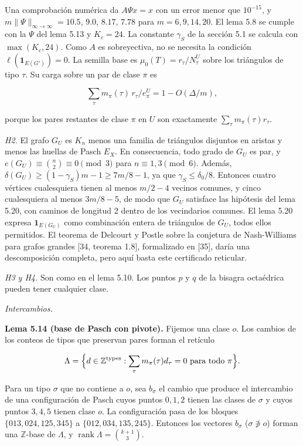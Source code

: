 \documentclass[spanish,11pt,a4paper]{article}
\begin{document}
Una comprobación numérica da \(A\Psi x=x\) con un error menor que \(10^{-15}\), y \(m\|\Psi\|_{\infty\to\infty}=10.5\), \(9.0\), \(8.17\), \(7.78\) para \(m=6,9,14,20\). El lema 5.8 se cumple con la \(\Psi\) del lema 5.13 y \(K_c=24\). La constante \(\gamma_S\) de la sección 5.1 se calcula con \(\max(K_c,24)\). Como \(A\) es sobreyectiva, no se necesita la condición \(\ell(\mathbf 1_{E(G')})=0\). La semilla base es \(\mu_0(T)=r_\tau/N^U_\tau\) sobre los triángulos de tipo \(\tau\). Su carga sobre un par de clase \(\pi\) es

\nopagebreak[4]
\[\sum_\tau m_\pi(\tau)\,r_\tau/e^U_\pi=1-O(\Delta/m),\]

porque los pares restantes de clase \(\pi\) en \(U\) son exactamente \(\sum_\tau m_\pi(\tau)r_\tau\).

\emph{H2.} El grafo \(G_U\) es \(K_n\) menos una familia de triángulos disjuntos en aristas y menos las huellas de Pasch \(E_X\). En consecuencia, todo grado de \(G_U\) es par, y \(e(G_U)\equiv\binom{n}{2}\equiv0\pmod 3\) para \(n\equiv1,3\pmod 6\). Además, \(\delta(G_U)\ge(1-\gamma_S)m-1\ge7m/8-1\), ya que \(\gamma_S\le\delta_0/8\). Entonces cuatro vértices cualesquiera tienen al menos \(m/2-4\) vecinos comunes, y cinco cualesquiera al menos \(3m/8-5\), de modo que \(G_U\) satisface las hipótesis del lema 5.20, con caminos de longitud 2 dentro de los vecindarios comunes. El lema 5.20 expresa \(\mathbf 1_{E(G_U)}\) como combinación entera de triángulos de \(G_U\), todos ellos permitidos. El teorema de Delcourt y Postle sobre la conjetura de Nash-Williams para grafos grandes {[}34, teorema 1.8{]}, formalizado en {[}35{]}, daría una descomposición completa, pero aquí basta este certificado reticular.

\emph{H3 y H4.} Son como en el lema 5.10. Los puntos \(p\) y \(q\) de la bisagra octaédrica pueden tener cualquier clase.

\emph{Intercambios.}

\textbf{Lema 5.14 (base de Pasch con pivote).} Fijemos una clase \(o\). Los cambios de los conteos de tipos que preservan pares forman el retículo

\nopagebreak[4]
\[\Lambda=\Bigl\{d\in\mathbb Z^{\mathrm{types}}:\sum_\tau m_\pi(\tau)d_\tau=0\text{ para todo }\pi\Bigr\}.\]

Para un tipo \(\sigma\) que no contiene a \(o\), sea \(b_\sigma\) el cambio que produce el intercambio de una configuración de Pasch cuyos puntos \(0,1,2\) tienen las clases de \(\sigma\) y cuyos puntos \(3,4,5\) tienen clase \(o\). La configuración pasa de los bloques \(\{013,024,125,345\}\) a \(\{012,034,135,245\}\). Entonces los vectores \(b_\sigma\) (\(\sigma\not\ni o\)) forman una \(\mathbb Z\)-base de \(\Lambda\), y \(\operatorname{rank}\Lambda=\binom{k+1}{3}\).
\end{document}
